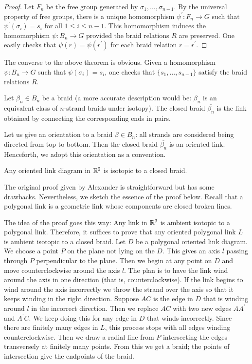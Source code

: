 \begin{proof}
\label{sec:artin-braid-group-7}
Let $F_n$ be the free group generated by $\sigma_1,\ldots, \sigma_{n-1}$. By the universal property of free groups, there is a unique homomorphism $\psi^{\prime}: F_n \to G$ such that $\psi^{\prime}(\sigma_i) = s_i$ for all $1 \leq i \leq n-1$. This homomorphism induces the homomorphism $\psi : B_n \to G$ provided the braid relations $R$ are preserved. One easily checks that $\psi(r) = \psi(r^{\prime})$ for each braid relation $r = r^{\prime}$.
\end{proof}

The converse to the above theorem is obvious. Given a homomorphism $\psi : B_n \to G$ such that $\psi(\sigma_i) = s_i$, one checks that $\{s_1, \ldots, s_{n-1}\}$ satisfy the braid relations $R$.

Let $\beta_n \in B_n$ be a braid (a more accurate description would be: $\beta_n$ is an equivalent class of $n$-strand braids under isotopy). The closed braid $\overline{\beta_n}$ is the link obtained by connecting the corresponding ends in pairs.

Let us give an orientation to a braid $\beta \in B_n$: all strands are considered being directed from top to bottom. Then the closed braid $\overline{\beta_n}$ is an oriented link. Henceforth, we adopt this orientation as a convention.

\begin{theorem}[Alexander]
\label{sec:artin-braid-group}
Any oriented link diagram in $\mathbb{R}^2$ is isotopic to a closed braid.
\end{theorem}

The original proof given by Alexander is straightforward but has some drawbacks. Nevertheless, we sketch the essence of the proof below. Recall that a polygonal link is a geometric link whose components are closed broken lines.

The idea of the proof goes this way: Any link in $\mathbb{R}^3$ is ambient isotopic to a polygonal link. Therefore, it suffices to prove that any oriented polygonal link $L$ is ambient isotopic to a closed braid. Let $D$ be a polygonal oriented link diagram. We choose a point $P$ on the plane not lying on the $D$. This gives an axis $l$ passing through $P$ perpendicular to the plane. Then we begin at any point on $D$ and move counterclockwise around the axis $l$. The plan is to have the link wind around the axis in one direction (that is, counterclockwise). If the link begins to wind around the axis incorrectly we throw the strand over the axis so that it keeps winding in the right direction. Suppose $AC$ is the edge in $D$ that is winding around $l$ in the incorrect direction. Then we replace $AC$ with two new edges $AA^{\prime}$ and $A^{\prime}C$. We keep doing this for any edge in $D$ that winds incorrectly. Since there are finitely many edges in $L$, this process stops with all edges winding counterclockwise. Then we draw a radial line from $P$ intersecting the edges transversely at finitely many points. From this we get a braid; the points of intersection give the endpoints of the braid.


